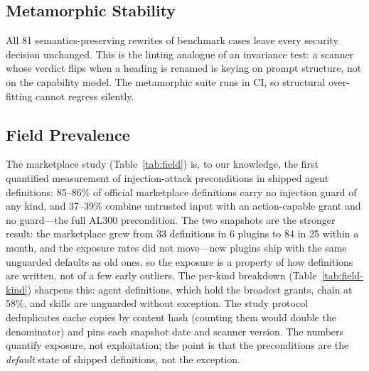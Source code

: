 \documentclass[11pt]{article}
\begin{document}
\subsection{Metamorphic Stability}
All 81 semantics-preserving rewrites of benchmark cases leave every security decision unchanged.
This is the linting analogue of an invariance test: a scanner whose verdict flips when a heading
is renamed is keying on prompt structure, not on the capability model. The metamorphic suite runs
in CI, so structural over-fitting cannot regress silently.

\subsection{Field Prevalence}
The marketplace study (Table~\ref{tab:field}) is, to our knowledge, the first quantified
measurement of injection-attack preconditions in shipped agent definitions: 85--86\% of official
marketplace definitions carry no injection guard of any kind, and 37--39\% combine untrusted input
with an action-capable grant and no guard---the full AL300 precondition. The two snapshots are the
stronger result: the marketplace grew from 33 definitions in 6 plugins to 84 in 25 within a month,
and the exposure rates did not move---new plugins ship with the same unguarded defaults as old
ones, so the exposure is a property of how definitions are written, not of a few early outliers.
The per-kind breakdown (Table~\ref{tab:field-kind}) sharpens this: agent definitions, which hold
the broadest grants, chain at 58\%, and skills are unguarded without exception. The study protocol
deduplicates cache copies by content hash (counting them would double the denominator) and pins
each snapshot date and scanner version. The numbers quantify exposure, not exploitation; the point
is that the preconditions are the \emph{default} state of shipped definitions, not the exception.
\end{document}
